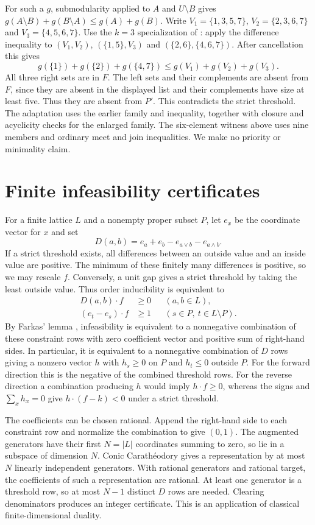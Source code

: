 \documentclass[11pt,a4paper]{amsart}
\begin{document}
For such a $g$, submodularity applied to $A$ and $U\setminus B$
gives $g(A\setminus B)+g(B\setminus A)\le g(A)+g(B)$.
Write $V_1=\{1,3,5,7\}$, $V_2=\{2,3,6,7\}$ and
$V_3=\{4,5,6,7\}$. Use the $k=3$ specialization of
\cite[Proposition~8]{sbc}: apply the difference inequality to
$(V_1,V_2)$, $(\{1,5\},V_3)$ and $(\{2,6\},\{4,6,7\})$.
After cancellation this gives
\[
 g(\{1\})+g(\{2\})+g(\{4,7\})\le g(V_1)+g(V_2)+g(V_3).
\]
All three right sets are in $F$. The left sets and their
complements are absent from $F$, since they are absent in the
displayed list and their complements have size at least five.
Thus they are absent from $P'$. This contradicts the strict threshold.
The adaptation uses the earlier family and inequality, together
with closure and acyclicity checks for the enlarged family.
The six-element witness above uses nine members and ordinary meet
and join inequalities. We make no priority or minimality claim.

\appendix
\section{Finite infeasibility certificates}

For a finite lattice $L$ and a nonempty proper subset $P$, let
$e_x$ be the coordinate vector for $x$ and set
\[
 D(a,b)=e_a+e_b-e_{a\vee b}-e_{a\wedge b}.
\]
If a strict threshold exists, all differences between an outside
value and an inside value are positive. The minimum of these
finitely many differences is positive, so we may rescale $f$.
Conversely, a unit gap gives a strict threshold by taking the
least outside value. Thus order inducibility is equivalent to
\begin{align*}
 D(a,b)\cdot f&\geq 0 &&(a,b\in L),\\
 (e_t-e_s)\cdot f&\geq 1 &&(s\in P,\ t\in L\setminus P).
\end{align*}
By Farkas' lemma \cite{farkas}, infeasibility is equivalent to a
nonnegative combination of these constraint rows with zero
coefficient vector and positive sum of right-hand sides. In
particular, it is equivalent to a nonnegative combination of
$D$ rows giving a nonzero vector $h$ with $h_s\geq0$ on $P$
and $h_t\leq0$ outside $P$. For the forward direction this
is the negative of the combined threshold rows. For the
reverse direction a combination producing $h$ would imply
$h\cdot f\geq0$, whereas the signs and $\sum_x h_x=0$ give
$h\cdot(f-k)<0$ under a strict threshold.

The coefficients can be chosen rational. Append the right-hand
side to each constraint row and normalize the combination to
give $(0,1)$. The augmented generators have their first
$N=|L|$ coordinates summing to zero, so lie in a subspace of
dimension $N$. Conic Carath\'eodory \cite[Section~17]{rock}
gives a representation by at most $N$ linearly independent
generators. With rational generators and rational target, the
coefficients of such a representation are rational. At least
one generator is a threshold row, so at most $N-1$ distinct
$D$ rows are needed. Clearing denominators produces an
integer certificate. This is an application of classical
finite-dimensional duality.
\end{document}
